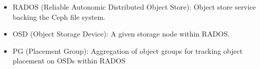 \begin{itemize}
  \item RADOS (Reliable Autonomic Distributed Object Store): Object
    store service backing the Ceph file system.
  
  \item OSD (Object Storage Device): A given storage node within
    RADOS.

  \item PG (Placement Group): Aggregation of object groups for
    tracking object placement on OSDs within RADOS

\end{itemize}
